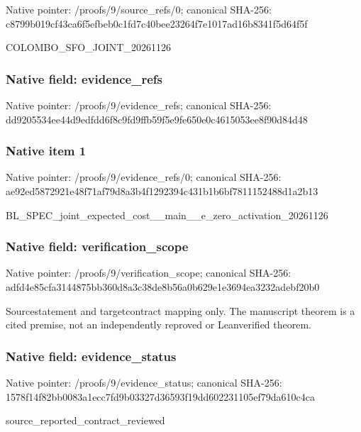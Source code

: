 \documentclass[10pt,a4paper]{article}
\begin{document}
Native pointer: /proofs/9/source\_refs/0; canonical SHA-256: c8799b019cf43ca6f5efbeb0\allowbreak{}c1fd7c40bee23264f7e1017a\allowbreak{}d16b8341f5d64f5f


COLOMBO\_SFO\_JOINT\_20261126


\subsubsection{Native field: evidence\_refs}


Native pointer: /proofs/9/evidence\_refs; canonical SHA-256: dd9205534ee44d9edfdd6f8c\allowbreak{}9fd9ffb59f5e9fe650e0c461\allowbreak{}5053ee8f90d84d48



\subsubsection{Native item 1}


Native pointer: /proofs/9/evidence\_refs/0; canonical SHA-256: ae92ed5872921e48f71af79d\allowbreak{}8a3b4f1292394c431b1b6bf7\allowbreak{}811152488d1a2b13


BL\_SPEC\_joint\_expected\_c\allowbreak{}ost\_\_main\_\_e\_zero\_activa\allowbreak{}tion\_20261126


\subsubsection{Native field: verification\_scope}


Native pointer: /proofs/9/verification\_scope; canonical SHA-256: adfd4e85cfa3144875bb360d\allowbreak{}8a3c38de8b56a0b629e1e369\allowbreak{}4ea3232adebf20b0


Sourcestatement and targetcontract mapping only. The manuscript theorem is a cited premise, not an independently reproved or Leanverified theorem.


\subsubsection{Native field: evidence\_status}


Native pointer: /proofs/9/evidence\_status; canonical SHA-256: 1578f14f82bb0083a1ecc7fd\allowbreak{}9b03327d36593f19dd602231\allowbreak{}105ef79da610c4ca


source\_reported\_contract\_reviewed
\end{document}
